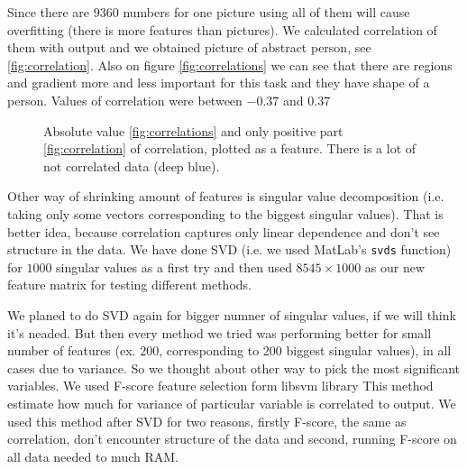 \documentclass[]{article}
\begin{document}
  Since there are $9360$ numbers for one picture using all of them will cause overfitting (there is more features than pictures). We calculated correlation of them with output and we obtained picture of abstract person, see \ref{fig:correlation}.
  Also on figure \ref{fig:correlations} we can see that there are regions and gradient more and less important for this task and they have shape of a person. Values of correlation were between $-0.37$ and $0.37$
  \begin{figure}[t]
    \center
      \;\;\;
    \caption{Absolute value \ref{fig:correlations} and only positive part \ref{fig:correlation} of correlation, plotted as a feature. There is a lot of not correlated data (deep blue).}
  \end{figure}
  
  Other way of shrinking amount of features is singular value decomposition (i.e. taking only some vectors corresponding to the biggest singular values). That is better idea, because correlation captures only linear dependence and don't see structure in the data. We have done SVD (i.e. we used MatLab's \verb+svds+ function) for $1000$ singular values as a first try and then used $8545\times1000$ as our new feature matrix for testing different methods. 
  
  We planed to do SVD again for bigger numner of singular values, if we will think it's neaded. But then every method we tried was performing better for small number of features (ex. $200$, corresponding to $200$ biggest singular values), in all cases due to variance. So we thought about other way to pick the most significant variables. We used F-score feature selection form libsvm library %
  This method estimate how much for variance of particular variable is correlated to output. We used this method after SVD for two reasons, firstly F-score, the same as correlation, don't encounter structure of the data and second, running F-score on all data needed to much RAM. 
   
\end{document}
